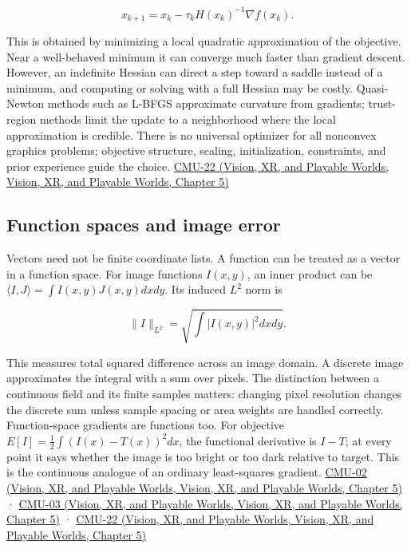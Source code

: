 \[
x_{k+1}=x_k-\tau_k H(x_k)^{-1}\nabla f(x_k).
\]

This is obtained by minimizing a local quadratic approximation of the objective. Near a well-behaved minimum it can converge much faster than gradient descent. However, an indefinite Hessian can direct a step toward a saddle instead of a minimum, and computing or solving with a full Hessian may be costly. Quasi-Newton methods such as L-BFGS approximate curvature from gradients; trust-region methods limit the update to a neighborhood where the local approximation is credible. There is no universal optimizer for all nonconvex graphics problems; objective structure, scaling, initialization, constraints, and prior experience guide the choice. \href{../07-Vision-XR-and-Playable-Worlds/main.pdf\#nameddest=04-visual-computing-ii-ch036-cmu-22---optimization}{CMU-22 (Vision, XR, and Playable Worlds, Vision, XR, and Playable Worlds, Chapter 5)}

\subsection{Function spaces and image error}\label{04-visual-computing-ii-ch029-function-spaces-and-image-error}

Vectors need not be finite coordinate lists. A function can be treated as a vector in a function space. For image functions \(I(x,y)\), an inner product can be \(\langle I,J\rangle=\int I(x,y)J(x,y)dxdy\). Its induced \(L^2\) norm is

\[
\|I\|_{L^2}=\sqrt{\int |I(x,y)|^2dxdy}.
\]

This measures total squared difference across an image domain. A discrete image approximates the integral with a sum over pixels. The distinction between a continuous field and its finite samples matters: changing pixel resolution changes the discrete sum unless sample spacing or area weights are handled correctly. Function-space gradients are functions too. For objective \(E[I]=\tfrac12\int (I(x)-T(x))^2dx\), the functional derivative is \(I-T\); at every point it says whether the image is too bright or too dark relative to target. This is the continuous analogue of an ordinary least-squares gradient. \href{../07-Vision-XR-and-Playable-Worlds/main.pdf\#nameddest=04-visual-computing-ii-ch036-cmu-02---linear-algebra-preview}{CMU-02 (Vision, XR, and Playable Worlds, Vision, XR, and Playable Worlds, Chapter 5)} · \href{../07-Vision-XR-and-Playable-Worlds/main.pdf\#nameddest=04-visual-computing-ii-ch036-cmu-03---vector-calculus-preview}{CMU-03 (Vision, XR, and Playable Worlds, Vision, XR, and Playable Worlds, Chapter 5)} · \href{../07-Vision-XR-and-Playable-Worlds/main.pdf\#nameddest=04-visual-computing-ii-ch036-cmu-22---optimization}{CMU-22 (Vision, XR, and Playable Worlds, Vision, XR, and Playable Worlds, Chapter 5)}

